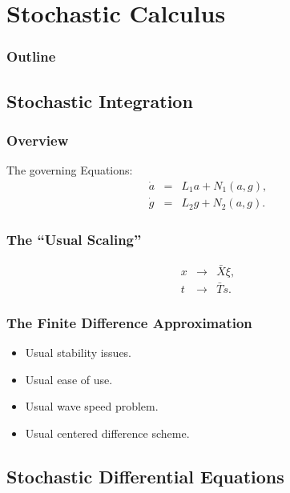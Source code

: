 \section{Stochastic Calculus}


\begin{frame}
  \frametitle{Outline}
  \tableofcontents[ currentsection]
\end{frame}

\subsection{Stochastic Integration}

\begin{frame}
  \frametitle{Overview}

  The governing Equations:
  \begin{eqnarray*}
    \dot{a} & = & L_1a + N_1(a,g), \\
    \dot{g} & = & L_2g + N_2(a,g).
  \end{eqnarray*}


\end{frame}

\begin{frame}
  \frametitle{The ``Usual Scaling''}
  \begin{eqnarray*}
    x & \rightarrow & \bar{X} \xi, \\
    t & \rightarrow & \bar{T} s.
  \end{eqnarray*}

\end{frame}

\begin{frame}
  \frametitle{The Finite Difference Approximation}

  \begin{itemize}
  \item<4-> Usual stability issues.
  \item<3-> Usual ease of use.
  \item<2-> Usual wave speed problem.
  \item<1-2> Usual centered difference scheme.
  \end{itemize}

\end{frame}


\subsection{Stochastic Differential Equations}

